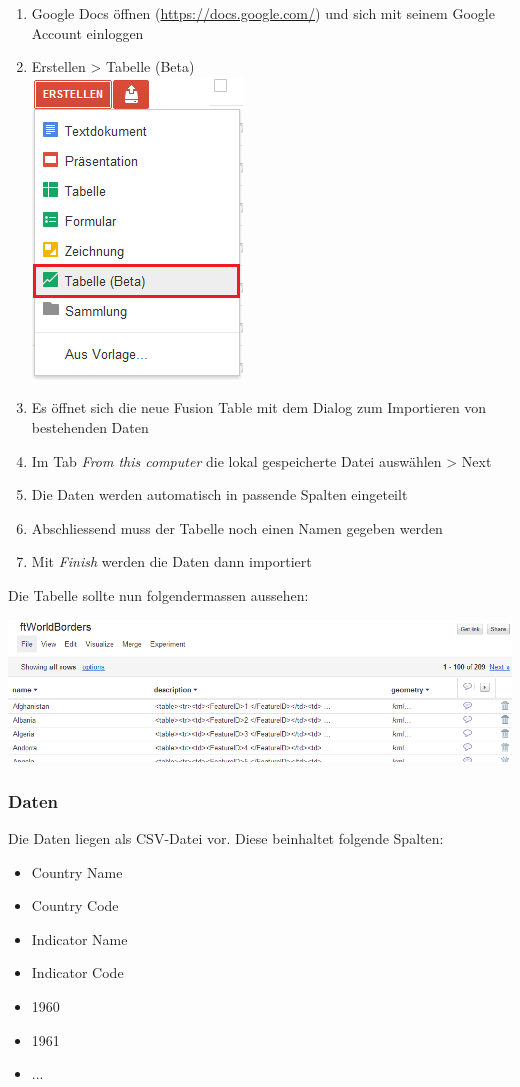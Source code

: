 \begin{enumerate}
\item Google Docs öffnen (\url{https://docs.google.com/}) und sich mit seinem Google Account einloggen
\item Erstellen > Tabelle (Beta) \\ \includegraphics{images/usecase1-worlddata/worlddata-worldborders_import1.png}
\item Es öffnet sich die neue Fusion Table mit dem Dialog zum Importieren von bestehenden Daten
\item Im Tab \emph{From this computer} die lokal gespeicherte Datei auswählen > Next
\item Die Daten werden automatisch in passende Spalten eingeteilt
\item Abschliessend muss der Tabelle noch einen Namen gegeben werden
\item Mit \emph{Finish} werden die Daten dann importiert
\end{enumerate}

Die Tabelle sollte nun folgendermassen aussehen:

\includegraphics[scale=0.65]{images/usecase1-worlddata/worlddata-worldborders_import_done.png}

\subsubsection{Daten}
Die Daten liegen als CSV-Datei vor. Diese beinhaltet folgende Spalten:
\begin{itemize}
\item Country Name
\item Country Code
\item Indicator Name
\item Indicator Code
\item 1960
\item 1961
\item ...
\end{itemize}

